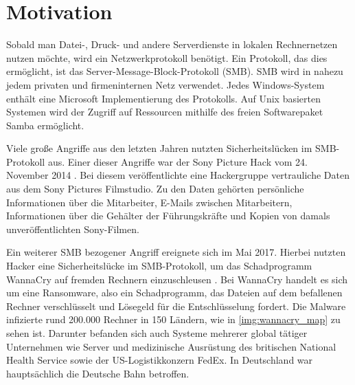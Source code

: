 \documentclass{AIFB_ITI_Crypto_Seminar}
\begin{document}
\makeTitleAndTOC
%
%
\section{Motivation}
Sobald man Datei-, Druck- und andere Serverdienste in lokalen Rechnernetzen nutzen möchte, wird ein Netzwerkprotokoll benötigt. Ein Protokoll, das dies ermöglicht, ist das Server-Message-Block-Protokoll (SMB). SMB wird in nahezu jedem privaten und firmeninternen Netz verwendet. Jedes Windows-System enthält eine Microsoft Implementierung des Protokolls. Auf Unix basierten Systemen wird der Zugriff auf Ressourcen mithilfe des freien Softwarepaket Samba ermöglicht. \par
Viele große Angriffe aus den letzten Jahren nutzten Sicherheitslücken im SMB-Protokoll aus. Einer dieser Angriffe war der Sony Picture Hack vom 24. November 2014 \cite{sony}. 
Bei diesem veröffentlichte eine Hackergruppe vertrauliche Daten aus dem Sony Pictures Filmstudio. Zu den Daten gehörten persönliche Informationen über die Mitarbeiter, E-Mails zwischen Mitarbeitern, Informationen über die Gehälter der Führungskräfte und Kopien von damals unveröffentlichten Sony-Filmen. \par
Ein weiterer SMB bezogener Angriff ereignete sich im Mai 2017. Hierbei nutzten Hacker eine Sicherheitslücke im SMB-Protokoll, um das Schadprogramm WannaCry auf fremden Rechnern einzuschleusen \cite{wannacry}. Bei WannaCry handelt es sich um eine Ransomware, also ein Schadprogramm, das Dateien auf dem befallenen Rechner verschlüsselt und Lösegeld für die Entschlüsselung fordert. Die Malware infizierte rund 200.000 Rechner in 150 Ländern, wie in \autoref{img:wannacry_map} zu sehen ist. Darunter befanden sich auch Systeme mehrerer global tätiger Unternehmen wie Server und medizinische Ausrüstung des britischen National Health Service sowie der US-Logistikkonzern FedEx. In Deutschland war hauptsächlich die Deutsche Bahn betroffen.  \par
\end{document}
